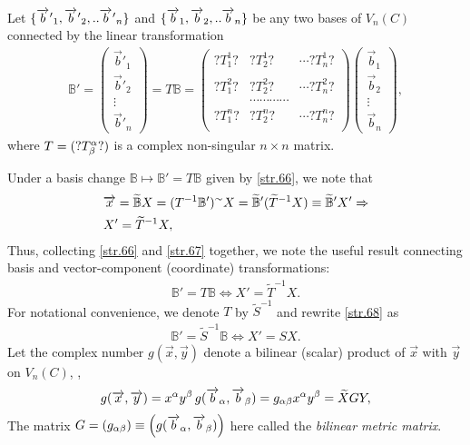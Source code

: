 \begin{small}
 Let $\{ 
{\overrightarrow{b}\hspace*{.3pt}'}_1,{\overrightarrow{b}\hspace*{.3pt}'}_2,.. {\overrightarrow{b}\hspace*{.3pt}'}_n \}$ and 
$\{\overrightarrow{b}_1,\overrightarrow{b}_2,.. \overrightarrow{b}_n\}$ be any two bases of 
$V_n(C)$ connected by the linear transformation 
\begin{align}\label{str.66}
\mathbb{B}'= \begin{pmatrix}\vec{b}'_1\\ 
\vec{b}'_2\\\vdots\\ \vec{b}'_n\end{pmatrix}
=T\mathbb{B}=
\begin{pmatrix}?T^1_1?  &?T^1_2?  &\cdots ?T^1_n?\\\\
?T^2_1?  &?T^2_2?  &\cdots ?T^2_n?\\
&\cdots\cdots\cdots\cdots&\\
?T^n_1?  &?T^n_2?  &\cdots ?T^n_n?\\
\end{pmatrix}\begin{pmatrix}\vec{b}_1\\ 
\vec{b}_2\\\vdots\\ \vec{b}_n\end{pmatrix},
\end{align}
where $T=(?T^{{\alpha}}_{{\beta}}?)$ is a complex 
non-singular $n\times n$ matrix. 

Under a basis change $\mathbb{B}\mapsto \mathbb{B}'= 
T\mathbb{B}$ given by \eqref{str.66}, we note that 
\begin{align}\label{str.67}
&\overrightarrow{x}=\widetilde{\mathbb{B}}X=(T^{-1}\mathbb{B}')^{\sim}
X=\widetilde{\mathbb{B}}'(\widetilde{T}^{-1}X)\equiv 
\widetilde{\mathbb{B}}'X'\Rightarrow\notag\\ 
&X'=\widetilde{T}^{-1}X,
\end{align}
Thus, collecting \eqref{str.66} and \eqref{str.67}
together, we note the useful result connecting basis and 
vector-component (coordinate) transformations:
\begin{align}\label{str.68}
\mathbb{B}'
=T\mathbb{B}\Leftrightarrow X'=\tilde{T}^{-1}X.
\end{align}
For notational convenience, we denote $T$ by 
$\tilde{S}^{-1}$ and rewrite \eqref{str.68} as 
\begin{align}\label{str.69}
\mathbb{B}'
=\tilde{S}^{-1}\mathbb{B}\Leftrightarrow X'=SX.
\end{align}
 Let the complex 
number $g(\vec{x},\vec{y})$ denote a bilinear (scalar)
product of $\vec{x}$ with $\vec{y}$ on $V_n(C)$, \ie, 
\begin{align} \label{str.70}
g(\overrightarrow{x},\overrightarrow{y}) = x^{{\alpha}} y^{{\beta}}
\,g(\overrightarrow{b}_{{\alpha}},\overrightarrow{b}_{{\beta}})=
g_{{\alpha}{\beta}}x^{{\alpha}} y^{{\beta}} =\widetilde{X}GY,
\end{align}
The matrix $G=(g_{{\alpha}{\beta}}) \equiv
\Big(g(\overrightarrow{b}_{{\alpha}},\overrightarrow{b}_{{\beta}})\Big)$ here called the
\textsl{bilinear metric matrix}.


\end{small}
